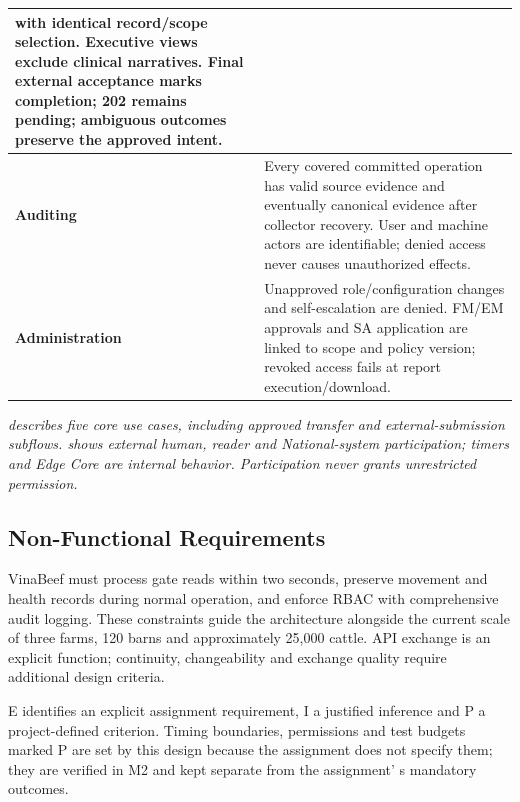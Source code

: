 {\begin{longtable}[]{|>{\raggedright\arraybackslash}p{}|>{\raggedright\arraybackslash}p{}|}
with identical record/scope selection. Executive views exclude clinical
narratives. Final external acceptance marks completion; 202 remains
pending; ambiguous outcomes preserve the approved intent. \\ \hline
\textbf{Auditing} & Every covered committed operation has valid source
evidence and eventually canonical evidence after collector recovery.
User and machine actors are identifiable; denied access never causes
unauthorized effects. \\ \hline
\textbf{Admin\-is\-tration} & Unapproved role/configuration changes and
self-escalation are denied. FM/EM approvals and SA application are
linked to scope and policy version; revoked access fails at report
execution/download. \\ \hline
\end{longtable}
}

\emph{ describes five core use cases, including approved
transfer and external-submission subflows.  shows external
human, reader and National-system participation; timers and Edge Core
are internal behavior. Participation never grants unrestricted
permission.}

\subsection{Non-Functional Requirements}\label{sec:2.2}

VinaBeef must process gate reads within two seconds, preserve movement
and health records during normal operation, and enforce RBAC with
comprehensive audit logging. These constraints guide the
architecture alongside the current scale of three farms, 120 barns and
approximately 25,000 cattle. API exchange is an explicit function;
continuity, changeability and exchange quality require additional design
criteria.

E identifies an explicit assignment requirement, I a justified inference
and P a project-defined criterion. Timing boundaries, permissions and test
budgets marked P are set by this design because the assignment does not
specify them; they are verified in M2 and kept separate from the
assignment' s mandatory outcomes.

